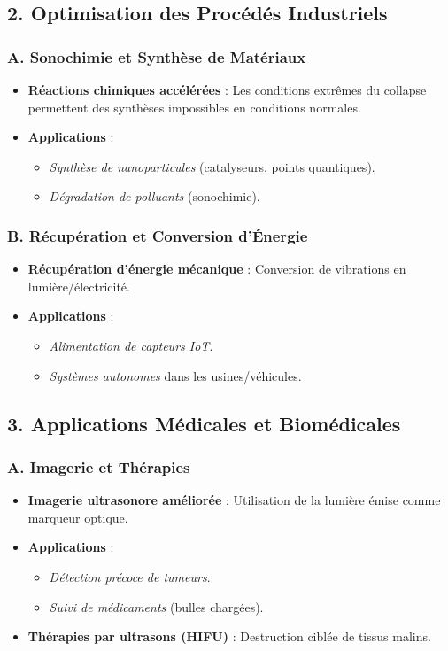 \documentclass[a4paper,12pt]{article}
\begin{document}
\subsection*{2. Optimisation des Procédés Industriels}
\subsubsection*{A. Sonochimie et Synthèse de Matériaux}
\begin{itemize}
    \item \textbf{Réactions chimiques accélérées} : Les conditions extrêmes du collapse permettent des synthèses impossibles en conditions normales.
    \item \textbf{Applications} :
    \begin{itemize}
        \item \textit{Synthèse de nanoparticules} (catalyseurs, points quantiques).
        \item \textit{Dégradation de polluants} (sonochimie).
    \end{itemize}
\end{itemize}

\subsubsection*{B. Récupération et Conversion d’Énergie}
\begin{itemize}
    \item \textbf{Récupération d’énergie mécanique} : Conversion de vibrations en lumière/électricité.
    \item \textbf{Applications} :
    \begin{itemize}
        \item \textit{Alimentation de capteurs IoT}.
        \item \textit{Systèmes autonomes} dans les usines/véhicules.
    \end{itemize}
\end{itemize}

\subsection*{3. Applications Médicales et Biomédicales}
\subsubsection*{A. Imagerie et Thérapies}
\begin{itemize}
    \item \textbf{Imagerie ultrasonore améliorée} : Utilisation de la lumière émise comme marqueur optique.
    \item \textbf{Applications} :
    \begin{itemize}
        \item \textit{Détection précoce de tumeurs}.
        \item \textit{Suivi de médicaments} (bulles chargées).
    \end{itemize}
    \item \textbf{Thérapies par ultrasons (HIFU)} : Destruction ciblée de tissus malins.
\end{itemize}
\end{document}
